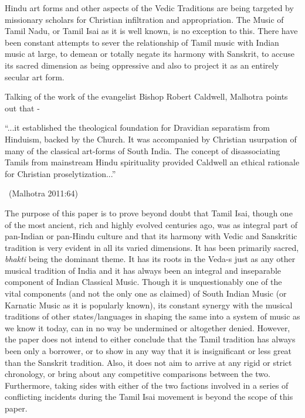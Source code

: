 Hindu art forms and other aspects of the Vedic Traditions are being targeted by missionary scholars for Christian infiltration and appropriation. The Music of Tamil Nadu, or Tamil Isai as it is well known, is no exception to this. There have been constant attempts to sever the relationship of Tamil music with Indian music at large, to demean or totally negate its harmony with Sanskrit, to accuse its sacred dimension as being oppressive and also to project it as an entirely secular art form.

Talking of the work of the evangelist Bishop Robert Caldwell, Malhotra points out that -

\begin{myquote}
“...it established the theological foundation for Dravidian separatism from Hinduism, backed by the Church. It was accompanied by Christian usurpation of many of the classical art-forms of South India. The concept of disassociating Tamils from mainstream Hindu spirituality provided Caldwell an ethical rationale for Christian proselytization...”

~\hfill (Malhotra 2011:64)
\end{myquote}

The purpose of this paper is to prove beyond doubt that Tamil Isai, though one of the most ancient, rich and highly evolved centuries ago, was as integral part of pan-Indian or pan-Hindu culture and that its harmony with Vedic and Sanskritic tradition is very evident in all its varied dimensions. It has been primarily sacred, \textit{bhakti} being the dominant theme. It has its roots in the Veda-s just as any other musical tradition of India and it has always been an integral and inseparable component of Indian Classical Music. Though it is unquestionably one of the vital components (and not the only one as claimed) of South Indian Music (or Karnatic Music as it is popularly known), its constant synergy with the musical traditions of other states/languages in shaping the same into a system of music as we know it today, can in no way be undermined or altogether denied. However, the paper does not intend to either conclude that the Tamil tradition has always been only a borrower, or to show in any way that it is insignificant or less great than the Sanskrit tradition. Also, it does not aim to arrive at any rigid or strict chronology, or bring about any competitive comparisons between the two. Furthermore, taking sides with either of the two factions involved in a series of conflicting incidents during the Tamil Isai movement is beyond the scope of this paper.


